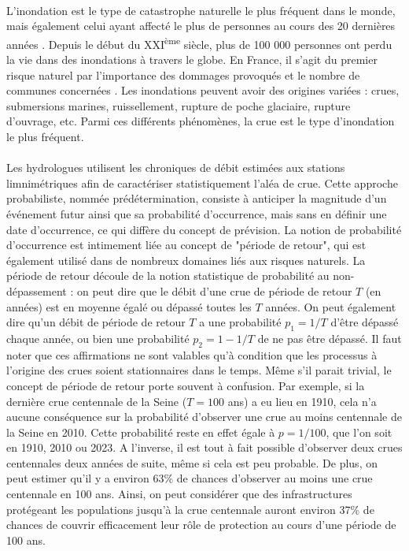	\paragraph{} L'inondation est le type de catastrophe naturelle le plus fréquent dans le monde, mais également celui ayant affecté le plus de personnes au cours des 20 dernières années \citep{undrr_human_2020}. Depuis le début du XXI\textsuperscript{ème} siècle, plus de 100 000 personnes ont perdu la vie dans des inondations à travers le globe. En France, il s'agit du premier risque naturel par l'importance des dommages provoqués et le nombre de communes concernées \citep{medd_prevention_2023}. Les inondations peuvent avoir des origines variées : crues, submersions marines, ruissellement, rupture de poche glaciaire, rupture d'ouvrage, etc. Parmi ces différents phénomènes, la crue est le type d'inondation le plus fréquent. 
	
	\paragraph{} Les hydrologues utilisent les chroniques de débit estimées aux stations limnimétriques afin de caractériser statistiquement l'aléa de crue. Cette approche probabiliste, nommée prédétermination, consiste à anticiper la magnitude d'un événement futur ainsi que sa probabilité d'occurrence, mais sans en définir une date d'occurrence, ce qui diffère du concept de prévision. La notion de probabilité d'occurrence est intimement liée au concept de "période de retour", qui est également utilisé dans de nombreux domaines liés aux risques naturels. La période de retour découle de la notion statistique de probabilité au non-dépassement : on peut dire que le débit d'une crue de période de retour $T$ (en années) est en moyenne égalé ou dépassé toutes les $T$ années. On peut également dire qu'un débit de période de retour $T$ a une probabilité $p_1 = 1/T$ d'être dépassé chaque année, ou bien une probabilité $p_2 = 1-1/T$ de ne pas être dépassé. Il faut noter que ces affirmations ne sont valables qu'à condition que les processus à l'origine des crues soient stationnaires dans le temps. Même s'il parait trivial, le concept de période de retour porte souvent à confusion. Par exemple, si la dernière crue centennale de la Seine ($T = 100$ ans) a eu lieu en 1910, cela n'a aucune conséquence sur la probabilité d'observer une crue au moins centennale de la Seine en 2010. Cette probabilité reste en effet égale à $p = 1/100$, que l'on soit en 1910, 2010 ou 2023. A l'inverse, il est tout à fait possible d'observer deux crues centennales deux années de suite, même si cela est peu probable. De plus, on peut estimer qu'il y a environ 63\% de chances d'observer au moins une crue centennale en 100 ans. Ainsi, on peut considérer que des infrastructures protégeant les populations jusqu'à la crue centennale auront environ 37\% de chances de couvrir efficacement leur rôle de protection au cours d'une période de 100 ans. 	
	
